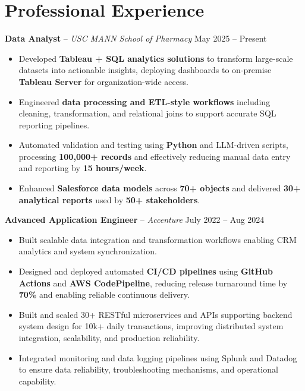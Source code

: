 \documentclass[letterpaper,11pt]{article}
\begin{document}
\section*{Professional Experience}
\textbf{Data Analyst} -- \textit{USC MANN School of Pharmacy} \hfill May 2025 -- Present
\begin{itemize}
\item Developed \textbf{Tableau + SQL analytics solutions} to transform large-scale datasets into actionable insights, deploying dashboards to on-premise \textbf{Tableau Server} for organization-wide access.
\item Engineered \textbf{data processing and ETL-style workflows} including cleaning, transformation, and relational joins to support accurate SQL reporting pipelines.
\item Automated validation and testing using \textbf{Python} and LLM-driven scripts, processing \textbf{100,000+ records} and effectively reducing manual data entry and reporting by \textbf{15 hours/week}.
\item Enhanced \textbf{Salesforce data models} across \textbf{70+ objects} and delivered \textbf{30+ analytical reports} used by \textbf{50+ stakeholders}.
\end{itemize}

\textbf{Advanced Application Engineer} -- \textit{Accenture} \hfill July 2022 -- Aug 2024
\begin{itemize}
\item Built scalable data integration and transformation workflows enabling CRM analytics and system synchronization.
\item Designed and deployed automated \textbf{CI/CD pipelines} using \textbf{GitHub Actions} and \textbf{AWS CodePipeline}, reducing release turnaround time by \textbf{70\%} and enabling reliable continuous delivery.
\item Built and scaled 30+ RESTful microservices and APIs supporting backend system design for 10k+ daily transactions, improving distributed system integration, scalability, and production reliability.
\item Integrated monitoring and data logging pipelines using Splunk and Datadog to ensure data reliability, troubleshooting mechanisms, and operational capability.
\end{itemize}


\end{document}
